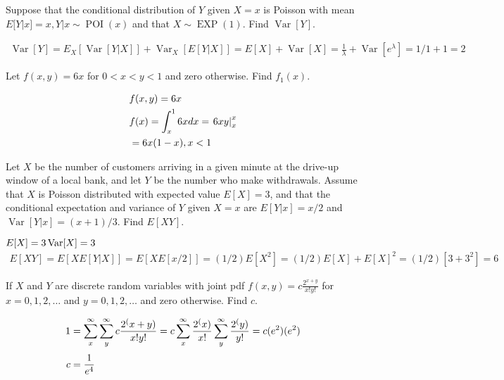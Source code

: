 \documentclass[answers]{exam}
\begin{document}
\begin{questions}
\question 
Suppose that the conditional distribution of $Y$ given $X=x$ is Poisson with mean 
\(E[Y|x] = x , Y|x\sim\operatorname{POI}(x)\) and that \(X\sim\operatorname{EXP}(1)\). Find \(\operatorname{Var}[Y]\).
\begin{solution}
	\begin{align*}
		\operatorname{Var}[Y] 
		= E_X[\operatorname{Var}[Y|X]] + \operatorname{Var}_X[E[Y|X]]
		= E[X] + \operatorname{Var}[X]
		= \frac{1}{\lambda} + \operatorname{Var}[e^\lambda]
		= 1/1 + 1 = 2
	\end{align*}
\end{solution}

\question 
Let \(f(x,y) = 6x\) for \(0<x<y<1\) and zero otherwise. Find \(f_1(x)\).
\begin{solution}
	\begin{align*}
		& f(x,y) = 6x \\
		& f(x) = \int_{x}^{1} 6x dx = \left. 6xy \right|_x^x \\ 
		&= 6x(1-x), \vspace{2em} x<1 
	\end{align*}
\end{solution}

\question 
Let $X$ be the number of customers arriving in a given minute at the drive-up window of a local bank, and let $Y$ be the number who make withdrawals. Assume that $X$ is Poisson distributed with expected value \(E[X]=3\), and that the conditional expectation and variance of $Y$ given \(X=x\) are \(E[Y|x] = x/2\) and \(\operatorname{Var}[Y|x]=(x+1)/3\). Find \(E[XY]\).
\begin{solution}
	\(E[X]=3 \vspace{2em} \operatorname{Var}[X] = 3\)
	\begin{align*}
		E[XY] = E[X E[Y|X]] = E[XE[x/2]] = (1/2)E[X^2] = (1/2)E[X]+E[X]^2 = (1/2)[3+3^2] = 6
	\end{align*}
\end{solution}

\question 
If $X$ and $Y$ are discrete random variables with joint pdf \(f(x,y) = c\frac{2^{x+y}}{x!y!}\) 
for \(x=0,1,2,\ldots\) and \(y=0,1,2,\ldots\) and zero otherwise. Find $c$.
\begin{solution}
	\begin{align*}
		1 &= \sum_{x}^{\infty}\sum_{y}^{\infty} c \frac{2^(x+y)}{x!y!}
		= c\sum_{x}^{\infty} \frac{2^(x)}{x!} \sum_{y}^{\infty} \frac{2^(y)}{y!}
		= c(e^2)(e^2) 
		\\[\jot]
		c &= \frac{1}{e^4}
	\end{align*}
\end{solution}


\end{questions}
\end{document}

